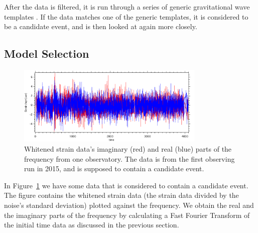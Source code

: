 \documentclass{article}
\begin{document}
After the data is filtered, it is run through a series of generic gravitational wave templates \cite{abbott2016observing}. If the data matches one of the generic templates, it is considered to be a candidate event, and is then looked at again more closely. \\


 
 \subsection{Model Selection}

   \begin{figure}[h]
   	\centering
   	\includegraphics[width=0.8\textwidth]{Figures/strainData.pdf}
   	\caption{Whitened strain data's imaginary (red) and real (blue) parts of the frequency from one observatory. The data is from the first observing run in 2015, and is supposed to contain a candidate event.}
   	\label{Fig:strainData}
   \end{figure}
   
 
 In Figure~\ref{Fig:strainData} we have some data that is considered to contain a candidate event. The figure contains the whitened strain data (the strain data divided by the noise's standard deviation) plotted against the frequency. We obtain the real and the imaginary parts of the frequency by calculating a Fast Fourier Transform of the initial time data as discussed in the previous section.\\
 
\end{document}
